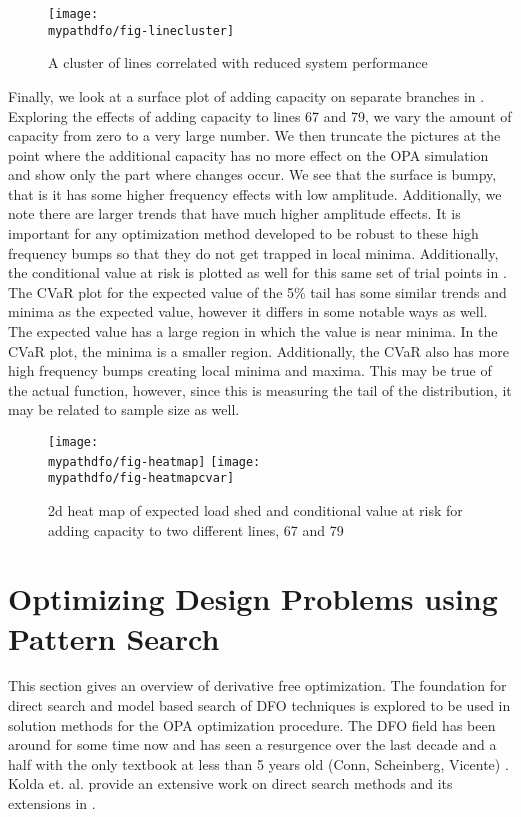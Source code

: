 \begin{figure}
\centering
\texttt{[image: \\mypathdfo/fig-linecluster]}
\caption{A cluster of lines correlated with reduced system performance}
\label{fig:cluster}
\end{figure}

Finally, we look at a surface plot of adding capacity on separate branches in .  Exploring the effects of adding capacity to lines 67 and 79, we vary the amount of capacity from zero to a very large number.  We then truncate the pictures at the point where the additional capacity has no more effect on the OPA simulation and show only the part where changes occur.  We see that the surface is bumpy, that is it has some higher frequency effects with low amplitude.  Additionally, we note there are larger trends that have much higher amplitude effects.  It is important for any optimization method developed to be robust to these high frequency bumps so that they do not get trapped in local minima.  Additionally, the conditional value at risk is plotted as well for this same set of trial points in . The CVaR plot for the expected value of the 5\% tail has some similar trends and minima as the expected value, however it differs in some notable ways as well.  The expected value has a large region in which the value is near minima.  In the CVaR plot, the minima is a smaller region.  Additionally, the CVaR also has more high frequency bumps creating local minima and maxima.  This may be true of the actual function, however, since this is measuring the tail of the distribution, it may be related to sample size as well.

\begin{figure}
\centering
\texttt{[image: \\mypathdfo/fig-heatmap]}
\texttt{[image: \\mypathdfo/fig-heatmapcvar]}
\caption[Expected load shed and conditional value at risk for capacity expansion]{2d heat map of expected load shed and conditional value at risk for adding capacity to two different lines, 67 and 79}\label{fig:heatmap}
\end{figure}



\section{Optimizing Design Problems using Pattern Search}

This section gives an overview of derivative free optimization.  The foundation for direct search and model based search of DFO techniques is explored to be used in solution methods for the OPA optimization procedure.  The DFO field has been around for some time now and has seen a resurgence over the last decade and a half with the only textbook at less than 5 years old (Conn, Scheinberg, Vicente) \cite{conn_2009}.  Kolda et. al. provide an extensive work on direct search methods and its extensions in \cite{kolda_2003}. 

